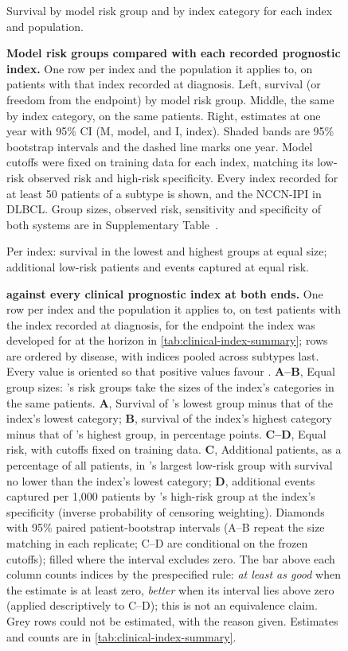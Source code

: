 \begin{figure}[p]
    {Survival by model risk group and by index category for each index and
    population.}
  \caption{\textbf{Model risk groups compared with each recorded prognostic
  index.} One row
  per index and the population it applies to, on patients with that index
  recorded at diagnosis. Left, survival (or freedom from the endpoint) by model risk group. Middle, the same by index category, on the same patients. Right, estimates at one year with 95\% CI (M, model, and I, index). Shaded bands are 95\%
  bootstrap intervals and the dashed line marks one year. Model cutoffs were
  fixed on training data for each index, matching its low-risk observed risk and
  high-risk specificity. Every index recorded for at least 50 patients of a
  subtype is shown, and the NCCN-IPI in DLBCL. Group sizes, observed risk,
  sensitivity and specificity of both systems are in Supplementary
  Table~. }
  \label{fig:score-overview}
\end{figure}

\begin{figure}[p]
    {Per index: survival in the lowest and highest groups at equal size;
    additional low-risk patients and events captured at equal risk.}
  \caption{\textbf{\opera{} against every clinical prognostic index at both
  ends.} One row per index and the population it applies to, on test patients
  with the index recorded at diagnosis, for the endpoint the index was developed
  for at the horizon in \cref{tab:clinical-index-summary}; rows are ordered by
  disease, with indices pooled across subtypes last. Every value is oriented so
  that positive values favour \opera{}. \textbf{A--B}, Equal group sizes:
  \opera{}'s risk groups take the sizes of the index's categories in the same
  patients. \textbf{A}, Survival of \opera{}'s lowest group minus that of the
  index's lowest category; \textbf{B}, survival of the index's highest category
  minus that of \opera{}'s highest group, in percentage points. \textbf{C--D},
  Equal risk, with cutoffs fixed on training data. \textbf{C}, Additional
  patients, as a percentage of all patients, in \opera{}'s largest low-risk group
  with survival no lower than the index's lowest category; \textbf{D}, additional
  events captured per 1,000 patients by \opera{}'s high-risk group at the index's
  specificity (inverse probability of censoring weighting). Diamonds with 95\%
  paired patient-bootstrap intervals (A--B repeat the size matching in each
  replicate; C--D are conditional on the frozen cutoffs); filled where the
  interval excludes zero. The bar above each column counts indices by the
  prespecified rule: \emph{at least as good} when the estimate is at least zero,
  \emph{better} when its interval lies above zero (applied descriptively to C--D);
  this is not an equivalence claim. Grey rows could not be estimated, with the
  reason given. Estimates and counts are in \cref{tab:clinical-index-summary}.}
  \label{fig:clinical-index-summary}
\end{figure}

